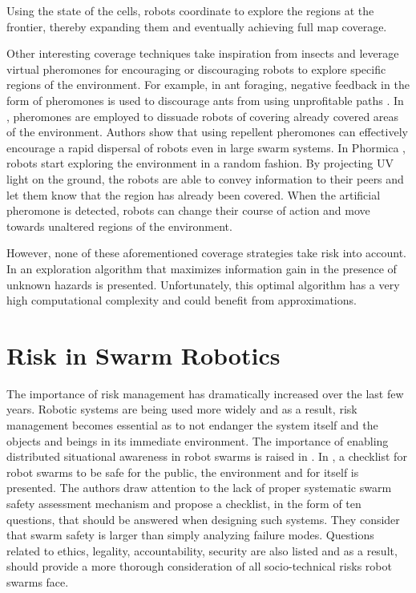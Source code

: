 Using the state of the cells, robots coordinate to explore the regions at the frontier, thereby expanding them and eventually achieving full map coverage.

Other interesting coverage techniques take inspiration from insects and leverage virtual pheromones for encouraging or discouraging robots to explore specific regions of the environment. For example, in ant foraging, negative feedback in the form of pheromones is used to discourage ants from using unprofitable paths \cite{robinson2005no}. In \cite{hunt2019testing}, pheromones are employed to dissuade robots of covering already covered areas of the environment. Authors show that using repellent pheromones can effectively encourage a rapid dispersal of robots even in large swarm systems. In Phormica \cite{salman2020phormica}, robots start exploring the environment in a random fashion. By projecting \ac{UV} light on the ground, the robots are able to convey information to their peers and let them know that the region has already been covered. When the artificial pheromone is detected, robots can change their course of action and move towards unaltered regions of the environment.

However, none of these aforementioned coverage strategies take
risk into account. In
\cite{dames2012decentralized,schwagerMultirobotControlPolicy2017}
an exploration algorithm that maximizes information gain in the presence of unknown hazards is presented. Unfortunately, this optimal algorithm has a
very high computational complexity and could benefit from approximations.



\section{Risk in Swarm Robotics}
The importance of risk management has dramatically increased over the last few years. Robotic systems are being used more widely and as a result, risk management becomes essential as to not endanger the system itself and the objects and beings in its immediate environment. The importance of enabling distributed situational awareness in robot swarms is raised in \cite{jones2020distributed}. In \cite{hunt2020checklist}, a checklist for robot swarms to be safe for the public, the environment and for itself is presented. The authors draw attention to the lack of proper systematic swarm safety assessment mechanism and propose a checklist, in the form of ten questions, that should be answered when designing such systems. They consider that swarm safety is larger than simply analyzing failure modes. Questions related to ethics, legality, accountability, security are also listed and as a result, should provide a more thorough consideration of all socio-technical risks robot swarms face. 

